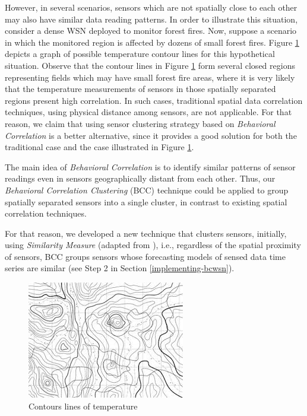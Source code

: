 \documentclass{acm_proc_article-sp}
\begin{document}
However, in several scenarios, sensors which are not spatially close to each
other may also have similar data reading patterns. In order to illustrate this 
situation, consider a dense WSN deployed to monitor forest fires.
Now, suppose a scenario in which the monitored region is affected by dozens of
small forest fires. Figure \ref{fig:contour_lines} depicts a graph of possible
temperature contour lines for this hypothetical situation. Observe that the
contour lines in Figure \ref{fig:contour_lines} form several closed regions
representing fields which may have small forest fire areas, where it is very
likely that the temperature measurements of sensors in those spatially separated
regions present high correlation. In such cases, traditional spatial data correlation techniques, using physical distance among sensors, are not applicable.
For that reason, we claim that using sensor clustering strategy based on
\textit{Behavioral Correlation} is a better alternative, since it provides a 
good solution for both the traditional case and the case illustrated in Figure 
\ref{fig:contour_lines}.
\vspace*{-.3cm}

The main idea of {\it Behavioral Correlation} is to identify
similar patterns of sensor readings even in sensors geographically
distant from each other. Thus, our {\it Behavioral Correlation Clustering} 
(BCC) technique could be applied to group spatially separated sensors into a
single cluster, in contrast to existing spatial correlation techniques.
\vspace*{-.3cm}

For that reason, we developed a new technique that clusters sensors, 
initially, using {\it Similarity Measure} (adapted from \cite{Liu2007}), 
i.e., regardless of the spatial proximity of sensors, BCC groups sensors 
whose forecasting models of sensed data time series are similar (see 
Step 2 in Section \ref{implementing-bcwsn}).
\vspace*{-.3cm}

\begin{figure}[!htb]
\centering
	\includegraphics[scale=0.9]{I2.png}
    \caption{Contours lines of temperature}
    \label{fig:contour_lines}
\end{figure}
\vspace*{-.3cm}
\end{document}
